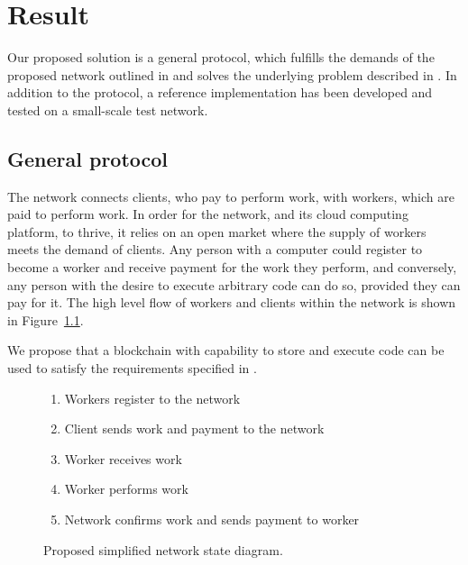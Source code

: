 \chapter{Result}
Our proposed solution is a general protocol, which fulfills the demands of the proposed network outlined in  and solves the underlying problem described in .
In addition to the protocol, a reference implementation has been developed and tested on a small-scale test network.

\section{General protocol}
\label{sec:res:protocol}
The network connects clients, who pay to perform work, with workers, which are paid to perform work. In order for the network, and its cloud computing platform, to thrive, it relies on an open market where the supply of workers meets the demand of clients. Any person with a computer could register to become a worker and receive payment for the work they perform, and conversely, any person with the desire to execute arbitrary code can do so, provided they can pay for it. The high level flow of workers and clients within the network is shown in Figure~\ref{network-schema}.

We propose that a blockchain with capability to store and execute code can be used to satisfy the requirements specified in .

\begin{figure}[ht]
\centering
{}

\begin{enumerate}
\item Workers register to the network
\item Client sends work and payment to the network
\item Worker receives work
\item Worker performs work
\item Network confirms work and sends payment to worker
\end{enumerate}
\caption{Proposed simplified network state diagram.}
\label{network-schema}
\end{figure}

